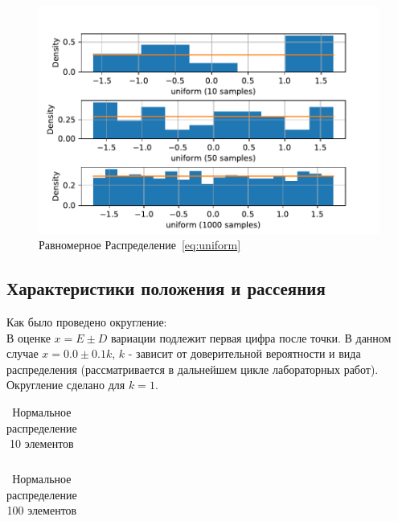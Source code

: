 \documentclass[a4paper]{article}
\begin{document}
        \begin{figure}[H]
            \centering
            \includegraphics[width = 16 cm]{src_lab_1/uniform}
            \caption{Равномерное Распределение~\eqref{eq:uniform}}
            \label{fig:uniform}
        \end{figure}

    	\subsection{Характеристики положения и рассеяния}
	\noindent Как было проведено округление:\\
В оценке $x=E  \pm D$ вариации подлежит первая цифра после точки. В данном случае $x=0.0 \pm 0.1k$,  $k$ - зависит от доверительной вероятности и вида распределения (рассматривается в дальнейшем цикле лабораторных работ). Округление сделано для  $k=1$.

	        \begin{table}[H]
            \centering
            \begin{tabular}{|c|c|c|c|c|c|}
                \hline
                
            \end{tabular}
            \caption{Нормальное распределение 10 элементов}
            \label{tab:norm_10}
        \end{table}

        \begin{table}[H]
            \centering
            \begin{tabular}{|c|c|c|c|c|c|}
                \hline
                
            \end{tabular}
            \caption{Нормальное распределение 100 элементов}
            \label{tab:norm_100}
        \end{table}
\end{document}
